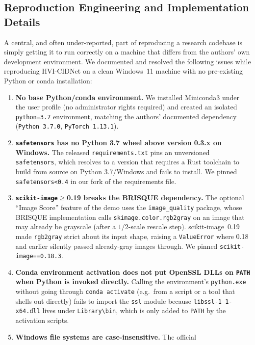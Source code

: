 \documentclass[conference]{IEEEtran}
\begin{document}
\subsection{Reproduction Engineering and Implementation Details}
\label{sec:engineering}
A central, and often under-reported, part of reproducing a research codebase
is simply getting it to run correctly on a machine that differs from the
authors' own development environment. We documented and resolved the
following issues while reproducing HVI-CIDNet on a clean Windows~11 machine
with no pre-existing Python or conda installation:

\begin{enumerate}
  \item \textbf{No base Python/conda environment.} We installed Miniconda3
  under the user profile (no administrator rights required) and created an
  isolated \texttt{python=3.7} environment, matching the authors' documented
  dependency (\texttt{Python 3.7.0}, \texttt{PyTorch 1.13.1}).
  \item \textbf{\texttt{safetensors} has no Python 3.7 wheel above
  version 0.3.x on Windows.} The released \texttt{requirements.txt} pins an
  unversioned \texttt{safetensors}, which resolves to a version that requires
  a Rust toolchain to build from source on Python 3.7/Windows and fails to
  install. We pinned \texttt{safetensors<0.4} in our fork of the
  requirements file.
  \item \textbf{\texttt{scikit-image}$\geq$0.19 breaks the BRISQUE
  dependency.} The optional ``Image Score'' feature of the demo uses the
  \texttt{image\_quality} package, whose BRISQUE implementation calls
  \texttt{skimage.color.rgb2gray} on an image that may already be grayscale
  (after a $1/2$-scale rescale step). scikit-image~0.19 made
  \texttt{rgb2gray} strict about its input shape, raising a
  \texttt{ValueError} where 0.18 and earlier silently passed already-gray
  images through. We pinned \texttt{scikit-image==0.18.3}.
  \item \textbf{Conda environment activation does not put OpenSSL DLLs on
  \texttt{PATH} when Python is invoked directly.} Calling the environment's
  \texttt{python.exe} without going through \texttt{conda activate} (e.g.\
  from a script or a tool that shells out directly) fails to import the
  \texttt{ssl} module because \texttt{libssl-1\_1-x64.dll} lives under
  \texttt{Library\textbackslash bin}, which is only added to \texttt{PATH} by
  the activation scripts.
  \item \textbf{Windows file systems are case-insensitive.} The official

\end{enumerate}
\end{document}
